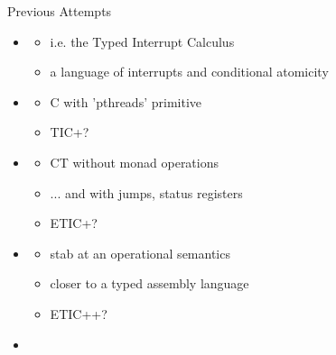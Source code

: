 \documentclass{beamer}
\begin{document}
\begin{frame}{Previous Attempts}

\begin{itemize}

\item{\Large{}}
  \begin{itemize}
  \item{i.e. the Typed Interrupt Calculus}
  \item{a language of interrupts and conditional atomicity}
  \end{itemize}
  
  \medskip

\item{\Large{\color{blue}{ETIC}}}
  \begin{itemize}
  \item{C with 'pthreads' primitive}
  \item{TIC+?}
  \end{itemize}

\medskip

\item{\Large{\color{blue}{OESS}}}
  \begin{itemize}
  \item{CT without monad operations}
  \item{... and with jumps, status registers}
  \item{ETIC+?}
  \end{itemize}

\medskip

\item{\Large{\color{blue}{The CHEAP Machine}}}
  \begin{itemize}
  \item{stab at an operational semantics}
  \item{closer to a typed assembly language}
  \item{ETIC++?}
  \end{itemize}
  
  \pause

\item{\emph{}}

\end{itemize}

\end{frame}
\end{document}
